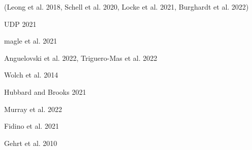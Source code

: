 \documentclass[12pt,a4paper]{article}
\begin{document}
(Leong et al. 2018, Schell et al. 2020, Locke et al. 2021, Burghardt et al. 2022) 
\cite{leong2018biodiversity,schell2020ecological,locke2021residential,burghardt2023current}

UDP 2021
\cite{udp2021}

magle et al. 2021
\cite{magle2021wealth}

Anguelovski et al. 2022, Triguero-Mas et al. 2022
\cite{anguelovski2022green,triguero2022exploring}

Wolch et al. 2014
\cite{wolch2014urban}

Hubbard and Brooks 2021 \cite{hubbard2021animals}

Murray et al. 2022 \cite{murray2022one}

Fidino et al. 2021 \cite{fidino2021landscape}

Gehrt et al. 2010 \cite{gehrt2010urban}


\end{document}
